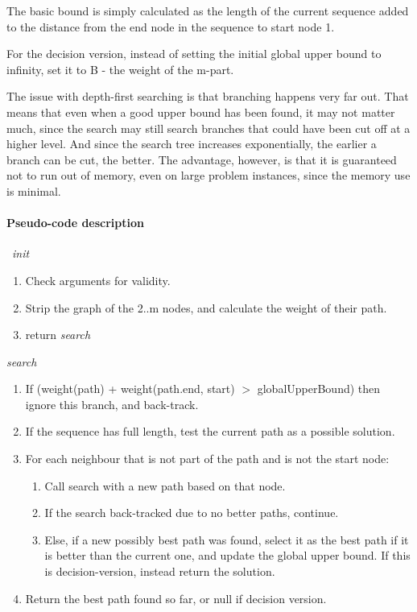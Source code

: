 The basic bound is simply calculated as the length of the current sequence
added to the distance from the end node in the sequence to start node 1.

For the decision version, instead of setting the initial global upper bound to
infinity, set it to B - the weight of the m-part.

The issue with depth-first searching is that branching happens very far out.
That means that even when a good upper bound has been found, it may not matter
much, since the search may still search branches that could have been cut off
at a higher level. And since the search tree increases exponentially,
the earlier a branch can be cut, the better. The advantage, however, is that
it is guaranteed not to run out of memory, even on large problem instances,
since the memory use is minimal.

\paragraph{Pseudo-code description}
\
\textit{init}
\begin{enumerate}
\item Check arguments for validity.
\item Strip the graph of the 2..m nodes, and calculate the weight of their path.
\item return \textit{search}
\end{enumerate}

\newline
\textit{search}
\begin{enumerate}
	\item If (weight(path) + weight(path.end, start) \(>\) globalUpperBound)
			then ignore this branch, and back-track.
	\item If the sequence has full length, test the current path as a possible solution.
	\item For each neighbour that is not part of the path and is not the start node:
	\begin{enumerate}
		\item Call search with a new path based on that node.
		\item If the search back-tracked due to no better paths, continue.
		\item Else, if a new possibly best path was found, select it as the
				best path if it is better than the current one, and update the
				global upper bound.
				If this is decision-version, instead return the solution.
	\end{enumerate}
	\item Return the best path found so far, or null if decision version.
\end{enumerate}

